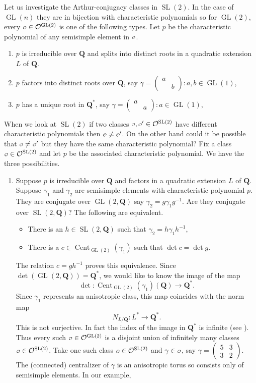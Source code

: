 \documentclass[11pt]{amsart}
\def\Q{\mathbf Q}
\def\O{\mathcal O}
\def\o{\scalebox{0.8}{$\scriptstyle\mathcal{O}$}}
\def\cb#1{{\color{black}#1}}
\def\cent{\operatorname{Cent}}
\def\det{\operatorname{det}}
\def\gl{\operatorname{GL}}
\def\sl{\operatorname{SL}}
\theoremstyle{remark}
\begin{document}
\cb{Let us investigate the Arthur-conjugacy classes in $\sl(2)$. In the case of $\gl(n)$ they are in bijection with characteristic polynomials so for $\gl(2)$, every $\o \in \O^{\gl(2)}$ is one of the following types. Let $p$ be the characteristic polynomial of any semisimple element in $\o$. 
\begin{enumerate}
	\item $p$ is irreducible over $\Q$ and splits into distinct roots in a quadratic extension $L$ of $\Q$.
	\item $p$ factors into distinct roots over $\Q$, say $\gamma = \begin{pmatrix} a & \\ & b \end{pmatrix}: 
			a, b \in \gl(1)$,
	\item $p$ has a unique root in $\Q^*$, say $\gamma = \begin{pmatrix} a & \\ & a \end{pmatrix}: a \in \gl(1)$,
\end{enumerate}
When we look at $\sl(2)$ if two classes $\o, \o' \in \O^{\sl(2)}$ have different characteristic polynomials then $\o \neq \o'$. On the other hand could it be possible that $\o \neq \o'$ but they have the same characteristic polynomial? Fix a class $\o \in \O^{\sl(2)}$ and let $p$ be the associated characteristic polynomial. We have the three possibilities. 
\begin{enumerate}
	\item Suppose $p$ is irreducible over $\Q$ and factors in a quadratic extension $L$ of $\Q$. Suppose $\gamma_1$ and $\gamma_2$ are semisimple elements with characteristic polynomial $p$. They are conjugate over $\gl(2, \Q)$ say $\gamma_2 = g \gamma_1 g^{-1}$. Are they conjugate over $\sl(2, \Q)$? The following are equivalent. 
	\begin{itemize}
		\item There is an $h \in \sl(2, \Q)$ such that $\gamma_2 = h \gamma_1 h^{-1}$,
		\item There is a $c \in \cent_{\gl(2)}(\gamma_1)$ such that $\det c = \det g$. 
	\end{itemize}
		The relation $c = gh^{-1}$ proves this equivalence. Since $\det(\gl(2, \Q)) = \Q^*$, we would like to know the image of the map
    		\[ \det : \cent_{\gl(2)}(\gamma_1)(\Q) \to \Q^*. \]
		Since $\gamma_1$ represents an anisotropic class, this map coincides with the norm map
		\[ N_{L/\Q} : L^* \to \Q^*. \]
		This is not surjective. In fact the index of the image in $\Q^*$ is infinite (see \cite{MR1068677}). Thus every such $\o \in \O^{\gl(2)}$ is a disjoint union of infinitely many classes $\o \in \O^{\sl(2)}$. Take one such class $\o \in \O^{\sl(2)}$ and $\gamma \in \o$, say $\gamma = \begin{pmatrix} 5 & 3 \\ 3 & 2 \end{pmatrix}$. The (connected) centralizer of $\gamma$ is an anisotropic torus so consists only of semisimple elements. In our example, 

\end{enumerate}}
\end{document}

